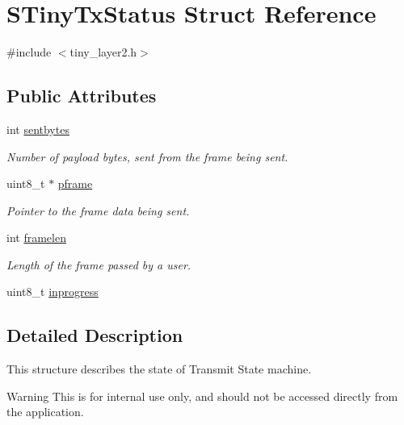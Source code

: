\hypertarget{structSTinyTxStatus}{}\section{S\+Tiny\+Tx\+Status Struct Reference}
\label{structSTinyTxStatus}


{\ttfamily \#include $<$tiny\+\_\+layer2.\+h$>$}

\subsection*{Public Attributes}
\begin{DoxyCompactItemize}
\item 
\hypertarget{structSTinyTxStatus_ab5074839815ccf15744e258ce4816c06}{}int \hyperlink{structSTinyTxStatus_ab5074839815ccf15744e258ce4816c06}{sentbytes}\label{structSTinyTxStatus_ab5074839815ccf15744e258ce4816c06}

\begin{DoxyCompactList}\small\item\em Number of payload bytes, sent from the frame being sent. \end{DoxyCompactList}\item 
\hypertarget{structSTinyTxStatus_adaddd27d02edb73ca0d9e5f81ae725e6}{}uint8\+\_\+t $\ast$ \hyperlink{structSTinyTxStatus_adaddd27d02edb73ca0d9e5f81ae725e6}{pframe}\label{structSTinyTxStatus_adaddd27d02edb73ca0d9e5f81ae725e6}

\begin{DoxyCompactList}\small\item\em Pointer to the frame data being sent. \end{DoxyCompactList}\item 
\hypertarget{structSTinyTxStatus_a9f6d1382fec34b6c7daf60d95c5a540d}{}int \hyperlink{structSTinyTxStatus_a9f6d1382fec34b6c7daf60d95c5a540d}{framelen}\label{structSTinyTxStatus_a9f6d1382fec34b6c7daf60d95c5a540d}

\begin{DoxyCompactList}\small\item\em Length of the frame passed by a user. \end{DoxyCompactList}\item 
uint8\+\_\+t \hyperlink{structSTinyTxStatus_a8d7fa9861ba2adb1fd4ad4689548d238}{inprogress}
\end{DoxyCompactItemize}


\subsection{Detailed Description}
This structure describes the state of Transmit State machine. \begin{DoxyWarning}{Warning}
This is for internal use only, and should not be accessed directly from the application. 
\end{DoxyWarning}


